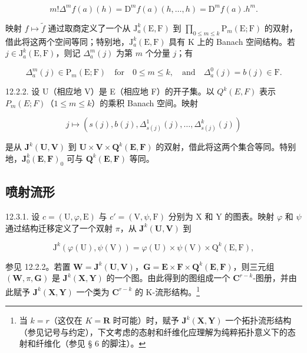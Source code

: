 \[
m! \Delta^ {m} f (a) (h) = \mathrm{D} ^ {m} f (a) (h, \dots , h) = \mathrm{D} ^ {m} f (a). h ^ {m}.
\]

映射 \(f\mapsto\tilde{f}\) 通过取商定义了一个从 \(\mathrm{J}_{a}^{k}(\mathrm{E},\mathrm{F})\) 到 \(\prod_{0\leqslant m\leqslant k}\mathrm{P}_{m}(\mathrm{E};\mathrm{F})\) 的双射，借此将这两个空间等同；特别地，\(\mathrm{J}_{a}^{k}(\mathrm{E},\mathrm{F})\) 具有 K 上的 Banach 空间结构。若 \(j\in\mathrm{J}_{a}^{k}(\mathrm{E},\mathrm{F})\)，则记 \(\Delta_{a}^{m}(j)\) 为第 \(m\) 个分量 \(j\)；有

\[
\Delta_ {a} ^ {m} (j) \in \mathrm{P} _ {m} (\mathrm{E}; \mathrm{F}) \quad \text {for} \quad 0 \leqslant m \leqslant k, \quad \text {and} \quad \Delta_ {a} ^ {0} (j) = b (j) \in \mathrm{F}.
\]

12.2.2. 设 U（相应地 V）是 E（相应地 F）的开子集。以 \(Q^{k}(E, F)\) 表示 \(P_{m}(E; F)\)（\(1 \leqslant m \leqslant k\)）的乘积 Banach 空间。映射

\[
j \mapsto (s (j), b (j), \Delta_ {s (j)} ^ {1} (j), \dots , \Delta_ {s (j)} ^ {k} (j))
\]

是从 \(\mathbf{J}^{k}(\mathbf{U},\mathbf{V})\) 到 \(\mathbf{U}\times\mathbf{V}\times\mathbf{Q}^{k}(\mathbf{E},\mathbf{F})\) 的双射，借此将这两个集合等同。特别地，\(\mathbf{J}_{0}^{k}(\mathbf{E},\mathbf{F})_{0}\) 可与 \(\mathbf{Q}^{k}(\mathbf{E},\mathbf{F})\) 等同。

\subsection{喷射流形}

12.3.1. 设 \(c = (\mathrm{U}, \varphi, \mathrm{E})\) 与 \(c' = (\mathrm{V}, \psi, \mathrm{F})\) 分别为 X 和 Y 的图表。映射 \(\varphi\) 和 \(\psi\) 通过结构迁移定义了一个双射 \(\pi\)，从 \(\mathbf{J}^k (\mathbf{U},\mathbf{V})\) 到

\[
\mathrm{J} ^ {k} (\varphi (\mathrm{U}), \psi (\mathrm{V})) = \varphi (\mathrm{U}) \times \psi (\mathrm{V}) \times \mathrm{Q} ^ {k} (\mathrm{E}, \mathrm{F}),
\]

参见 12.2.2。若置 \(\mathbf{W} = \mathbf{J}^{k}(\mathbf{U},\mathbf{V})\)，\(\mathbf{G} = \mathbf{E}\times \mathbf{F}\times \mathbf{Q}^{k}(\mathbf{E},\mathbf{F})\)，则三元组 \((\mathbf{W},\pi ,\mathbf{G})\) 是 \(\mathbf{J}^k (\mathbf{X},\mathbf{Y})\) 的一个图。由此得到的图组成一个 \(\mathbf{C}^{r - k}\)-图册，并由此赋予 \(\mathbf{J}^k (\mathbf{X},\mathbf{Y})\) 一个类为 \(\mathbf{C}^{r - k}\) 的 K-流形结构。\footnote{当 \(k=r\)（这仅在 \(K=\mathbf{R}\) 时可能）时，赋予 \(\mathbf{J}^{k}(\mathbf{X},\mathbf{Y})\) 一个拓扑流形结构（参见记号与约定），下文考虑的态射和纤维化应理解为纯粹拓扑意义下的态射和纤维化（参见 § 6 的脚注）。}

